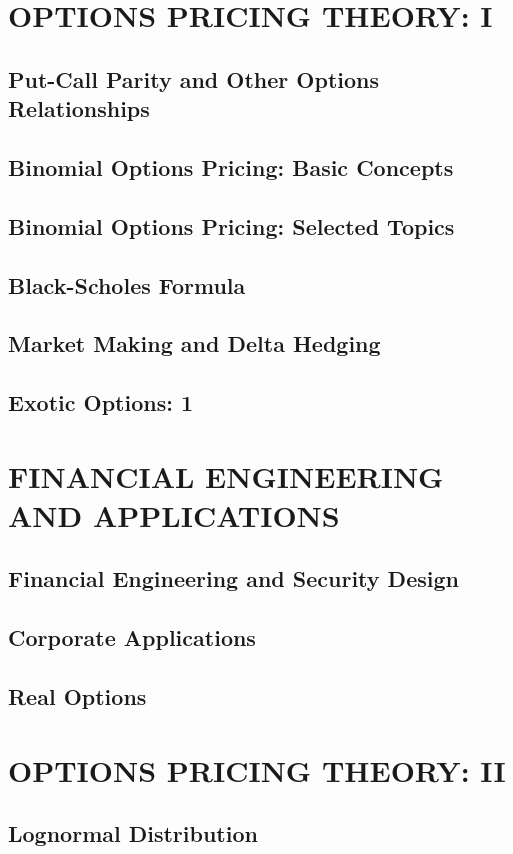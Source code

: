 \documentclass{book}
\theoremstyle{definition}
\theoremstyle{remark}
\begin{document}
\newpage
\chapter{OPTIONS PRICING THEORY: I}
\section{Put-Call Parity and Other Options Relationships}
\section{Binomial Options Pricing: Basic Concepts}
\section{Binomial Options Pricing: Selected Topics}
\section{Black-Scholes Formula}
\section{Market Making and Delta Hedging}
\section{Exotic Options: 1}

\newpage
\chapter{FINANCIAL ENGINEERING AND APPLICATIONS}
\section{Financial Engineering and Security Design}
\section{Corporate Applications}
\section{Real Options}

\newpage
\chapter{OPTIONS PRICING THEORY: II}
\section{Lognormal Distribution}
\end{document}
